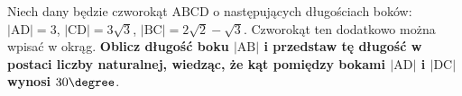 Niech dany będzie czworokąt $\mathrm{ABCD}$ o następujących długościach boków: $|\mathrm{AD}|=3$, $|\mathrm{CD}|=3\sqrt{3}$, $|\mathrm{BC}|=2\sqrt{2}-\sqrt{3}$. Czworokąt ten dodatkowo można wpisać w okrąg. \textbf{Oblicz długość boku $|\mathrm{AB}|$ i przedstaw tę długość w postaci liczby naturalnej, wiedząc, że kąt pomiędzy bokami $|\mathrm{AD}|$ i $|\mathrm{DC}|$ wynosi $30\degree$}.